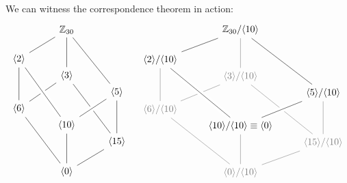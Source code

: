 \documentclass{ximera}
\begin{document}
\begin{example}
  We can witness the correspondence theorem in action:
  \[
  \begin{tikzcd}[row sep=0in]
    & \Z_{30} \ar[ldd,-]  \ar[ddd,-] \ar[rdddd,-] &       \\
    &\phantom{MM} & \\
    \<2\>  \ar[ddd,-] &   &  \\
    & \<3\>\ar[ldd,-]\ar[rdddd,-] & \\
    &  &  \<5\> \ar[ddd,-]\\
    \<6\> \ar[rdddd,-]& & \\
    &\<10\> \ar[ddd,-]\ar[ruu,-,white,line width=2mm]\ar[ruu,-]\ar[luuuu,-,white,line width=2mm]\ar[luuuu,-] & \\
    & & \<15\>\ar[ldd,-]\\
    &\phantom{MM} & \\
    & \<0\> &
  \end{tikzcd}
  \quad
  \begin{tikzcd}[row sep=0in]
    & \Z_{30}/\<10\>\ar[ldd,-]  \ar[white!50!black,ddd,-] \ar[rdddd,-] &       \\
    &\phantom{MM} & \\
    \<2\> /\<10\> \ar[white!50!black,ddd,-] &   &  \\
    & \color{white!50!black}\<3\>/\<10\>\ar[white!50!black,ldd,-]\ar[white!50!black,rdddd,-] & \\
    &  &  \<5\> /\<10\>\ar[white!50!black,ddd,-]\\
     \color{white!50!black}\<6\>/\<10\>\ar[white!50!black,rdddd,-]& & \\
    &\<10\>/\<10\> \equiv \<0\> \ar[white!50!black,ddd,-]\ar[ruu,-,white,line width=2mm]\ar[ruu,-]\ar[luuuu,-,white,line width=2mm]\ar[luuuu,-] & \\
    & & \color{white!50!black} \<15\>/\<10\>\ar[white!50!black,ldd,-]\\
    &\phantom{MM} & \\
    &  \color{white!50!black}\<0\>/\<10\> &
  \end{tikzcd}
  \]
  
\end{example}
\end{document}
